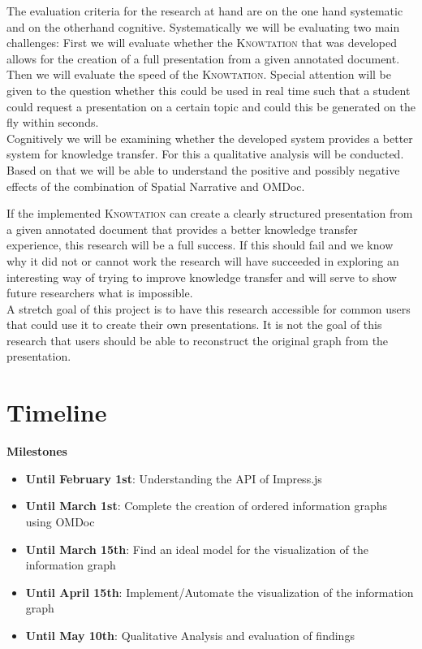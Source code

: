 \documentclass[twoside]{article}
\newcommand{\sys}{\textsc{Knowtation}\xspace}
\begin{document}

The evaluation criteria for the research at hand are on the one hand systematic and on the otherhand cognitive. Systematically we will be evaluating two main challenges: First we will evaluate whether the \sys that was developed allows for the creation of a full presentation from a given annotated document. Then we will evaluate the speed of the \sys . Special attention will be given to the question whether this could be used in real time such that a student could request a presentation on a certain topic and could this be generated on the fly within seconds.\\

Cognitively we will be examining whether the developed system provides a better system for knowledge transfer. For this a qualitative analysis will be conducted. Based on that we will be able to understand the positive and possibly negative effects of the combination of Spatial Narrative and OMDoc. 


If the implemented \sys can create a clearly structured presentation from a given annotated document that provides a better knowledge transfer experience, this research will be a full success. If this should fail and we know why it did not or cannot work the research will have succeeded in exploring an interesting way of trying to improve knowledge transfer and will serve to show future researchers what is impossible. \\

A stretch goal of this project is to have this research accessible for common users that could use it to create their own presentations. It is not the goal of this research that users should be able to reconstruct the original graph from the presentation.

\newpage
  \section{Timeline}

\textbf{Milestones}
\begin{itemize}
\item \textbf{Until February 1st}: Understanding the API of Impress.js
\item \textbf{Until March 1st}: Complete the creation of ordered information graphs using OMDoc
\item \textbf{Until March 15th}: Find an ideal model for the visualization of the information graph
\item \textbf{Until April 15th}: Implement/Automate the visualization of the information graph
\item \textbf{Until May 10th}: Qualitative Analysis and evaluation of findings 
\end{itemize}
\end{document}
